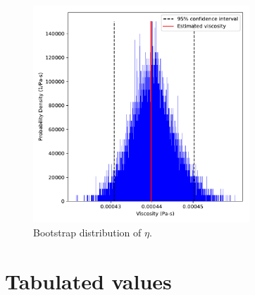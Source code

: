 \documentclass[preprint,review,12pt]{elsarticle}
\begin{document}
	\begin{figure}[htb!]
		\centering
		\includegraphics[width=3.2in]{GK_bootstraps_MCMC_rho0.pdf}
		\caption{Bootstrap distribution of $\eta$.}
		\label{fig:bootstraps}
	\end{figure} 

%	
	

    \clearpage

	\section{Tabulated values} \label{SI:Tabulated}
	
\end{document}
